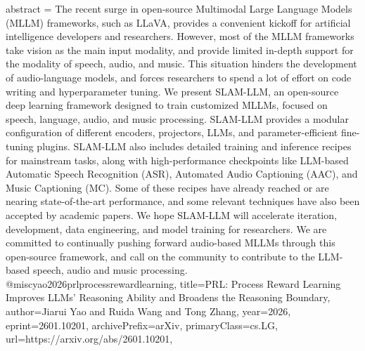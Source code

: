 {      abstract = {The recent surge in open-source Multimodal Large Language Models (MLLM) frameworks, such as LLaVA, provides a convenient kickoff for artificial intelligence developers and researchers. However, most of the MLLM frameworks take vision as the main input modality, and provide limited in-depth support for the modality of speech, audio, and music. This situation hinders the development of audio-language models, and forces researchers to spend a lot of effort on code writing and hyperparameter tuning. We present SLAM-LLM, an open-source deep learning framework designed to train customized MLLMs, focused on speech, language, audio, and music processing. SLAM-LLM provides a modular configuration of different encoders, projectors, LLMs, and parameter-efficient fine-tuning plugins. SLAM-LLM also includes detailed training and inference recipes for mainstream tasks, along with high-performance checkpoints like LLM-based Automatic Speech Recognition (ASR), Automated Audio Captioning (AAC), and Music Captioning (MC). Some of these recipes have already reached or are nearing state-of-the-art performance, and some relevant techniques have also been accepted by academic papers. We hope SLAM-LLM will accelerate iteration, development, data engineering, and model training for researchers. We are committed to continually pushing forward audio-based MLLMs through this open-source framework, and call on the community to contribute to the LLM-based speech, audio and music processing.}
}@misc{yao2026prlprocessrewardlearning,
      title={PRL: Process Reward Learning Improves LLMs' Reasoning Ability and Broadens the Reasoning Boundary}, 
      author={Jiarui Yao and Ruida Wang and Tong Zhang},
      year={2026},
      eprint={2601.10201},
      archivePrefix={arXiv},
      primaryClass={cs.LG},
      url={https://arxiv.org/abs/2601.10201},
}
